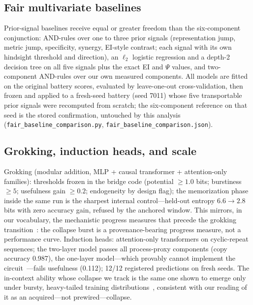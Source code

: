 \documentclass[11pt]{article}
\theoremstyle{definition}
\begin{document}
\subsection*{Fair multivariate baselines}
Prior-signal baselines receive equal or greater freedom than the
six-component conjunction: AND-rules over one to three prior signals
(representation jump, metric jump, specificity, synergy, EI-style
contrast; each signal with its own hindsight threshold and direction),
an $\ell_2$ logistic regression and a depth-2 decision tree on all
five signals plus the exact EI and $\Psi$ values, and two-component
AND-rules over our own measured components. All models are fitted on
the original battery scores, evaluated by leave-one-out
cross-validation, then frozen and applied to a fresh-seed battery
(seed 7011) whose five transportable prior signals were recomputed
from scratch; the six-component reference on that seed is the stored
confirmation, untouched by this analysis
(\texttt{fair\_baseline\_comparison.py},
\texttt{fair\_baseline\_comparison.json}).

\subsection*{Grokking, induction heads, and scale}
Grokking (modular addition, MLP + causal transformer + attention-only
families): thresholds frozen in the bridge code
(potential $\ge 1.0$ bits; burstiness $\ge 5$; usefulness gain
$\ge 0.2$; endogeneity by design flag); the memorization phase inside
the same run is the sharpest internal control---held-out entropy
$6.6 \to 2.8$ bits with zero accuracy gain, refused by the anchored
window. This mirrors, in our vocabulary, the mechanistic progress
measures that precede the grokking transition~\cite{nanda2023}: the
collapse burst is a provenance-bearing progress measure, not a
performance curve. Induction heads: attention-only transformers on cyclic-repeat
sequences; the two-layer model passes all process-proxy components (copy accuracy
0.987), the one-layer model---which provably cannot implement the
circuit~\cite{elhage2021}---fails usefulness (0.112); 12/12 registered
predictions on fresh seeds. The in-context ability whose collapse we
track is the same one shown to emerge only under bursty, heavy-tailed
training distributions~\cite{chan2022}, consistent with our reading of
it as an acquired---not prewired---collapse.
\end{document}
